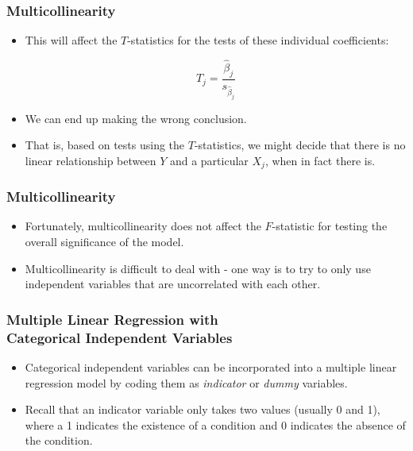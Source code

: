 \documentclass[14pt]{beamer}
\begin{document}
\begin{frame}
	\frametitle{Multicollinearity}
	
	\begin{itemize}[label={\color{blue}$\blacktriangleright$}]
		\item This will affect the $T$-statistics for the tests of these individual coefficients:
		
		\[
		T_j = \frac{\hat{\beta}_j}{s_{\hat{\beta}_j}}
		\]
		
		\item We can end up making the wrong conclusion.
		
		\item That is, based on tests using the $T$-statistics, we might decide that there is no linear relationship between $Y$ and a particular $X_j$, when in fact there is.
	\end{itemize}
	
\end{frame}
\begin{frame}
	\frametitle{Multicollinearity}
	
	\begin{itemize}[label={\color{blue}$\blacktriangleright$}]
		\item Fortunately, multicollinearity does not affect the $F$-statistic for testing the overall significance of the model.
		
		\item Multicollinearity is difficult to deal with - one way is to try to only use independent variables that are uncorrelated with each other.
	\end{itemize}
	
\end{frame}
\begin{frame}
	\frametitle{Multiple Linear Regression with\\Categorical Independent Variables}
	
	\begin{itemize}[label={\color{blue}$\blacktriangleright$}]
		\item Categorical independent variables can be incorporated into a multiple linear regression model by coding them as \textit{indicator} or \textit{dummy} variables.
		
		\item Recall that an indicator variable only takes two values (usually 0 and 1), where a 1 indicates the existence of a condition and 0 indicates the absence of the condition.
	\end{itemize}
	
\end{frame}
\end{document}
